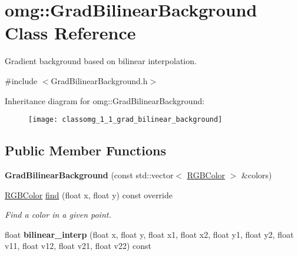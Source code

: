 \hypertarget{classomg_1_1_grad_bilinear_background}{}\section{omg\+::Grad\+Bilinear\+Background Class Reference}
\label{classomg_1_1_grad_bilinear_background}


Gradient background based on bilinear interpolation.  




{\ttfamily \#include $<$Grad\+Bilinear\+Background.\+h$>$}

Inheritance diagram for omg\+::Grad\+Bilinear\+Background\+:\begin{figure}[H]
\begin{center}
\leavevmode
\texttt{[image: classomg\_1\_1\_grad\_bilinear\_background]}
\end{center}
\end{figure}
\subsection*{Public Member Functions}
\begin{DoxyCompactItemize}
\item 
\mbox{\label{classomg_1_1_grad_bilinear_background_ab65634d8eb49ebe3303cb171d41b9d15}} 
{\bfseries Grad\+Bilinear\+Background} (const std\+::vector$<$ \mbox{\hyperlink{namespaceomg_a7b0e3f3dcf76f2b4758c314a41885917}{R\+G\+B\+Color}} $>$ \&colors)
\item 
\mbox{\hyperlink{namespaceomg_a7b0e3f3dcf76f2b4758c314a41885917}{R\+G\+B\+Color}} \mbox{\hyperlink{classomg_1_1_grad_bilinear_background_a074c489f7e8514420bd1e1f362202b03}{find}} (float x, float y) const override
\begin{DoxyCompactList}\small\item\em Find a color in a given point. \end{DoxyCompactList}\item 
\mbox{\label{classomg_1_1_grad_bilinear_background_a335f0acd0a4c56bcec29c33891ea5f44}} 
float {\bfseries bilinear\+\_\+interp} (float x, float y, float x1, float x2, float y1, float y2, float v11, float v12, float v21, float v22) const
\end{DoxyCompactItemize}


